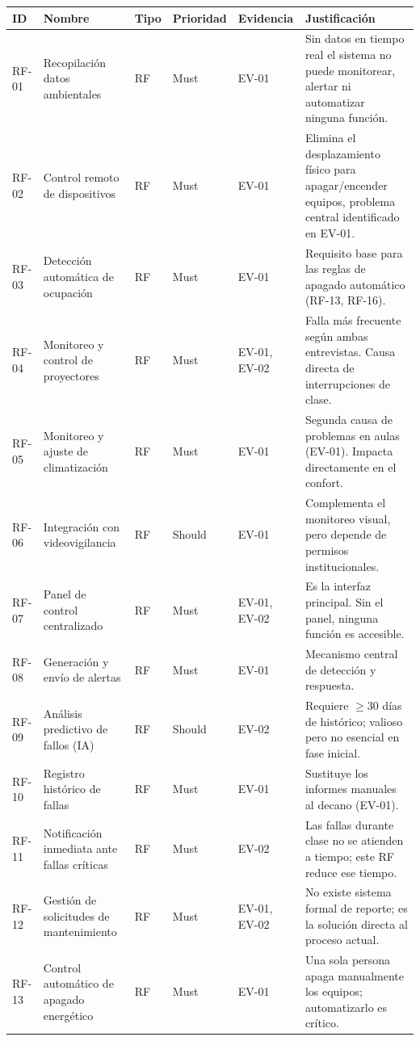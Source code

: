 \begingroup
\small
\begin{longtable}{|p{2.6cm}|p{2.6cm}|p{2.6cm}|p{2.6cm}|p{2.6cm}|p{2.6cm}|}
\hline
ID & Nombre & Tipo & Prioridad & Evidencia & Justificación \\ \hline
RF-01 & Recopilación datos ambientales & RF & Must & EV-01 & Sin datos en tiempo real el sistema no puede monitorear, alertar ni automatizar ninguna función. \\ \hline
RF-02 & Control remoto de dispositivos & RF & Must & EV-01 & Elimina el desplazamiento físico para apagar/encender equipos, problema central identificado en EV-01. \\ \hline
RF-03 & Detección automática de ocupación & RF & Must & EV-01 & Requisito base para las reglas de apagado automático (RF-13, RF-16). \\ \hline
RF-04 & Monitoreo y control de proyectores & RF & Must & EV-01, EV-02 & Falla más frecuente según ambas entrevistas. Causa directa de interrupciones de clase. \\ \hline
RF-05 & Monitoreo y ajuste de climatización & RF & Must & EV-01 & Segunda causa de problemas en aulas (EV-01). Impacta directamente en el confort. \\ \hline
RF-06 & Integración con videovigilancia & RF & Should & EV-01 & Complementa el monitoreo visual, pero depende de permisos institucionales. \\ \hline
RF-07 & Panel de control centralizado & RF & Must & EV-01, EV-02 & Es la interfaz principal. Sin el panel, ninguna función es accesible. \\ \hline
RF-08 & Generación y envío de alertas & RF & Must & EV-01 & Mecanismo central de detección y respuesta. \\ \hline
RF-09 & Análisis predictivo de fallos (IA) & RF & Should & EV-02 & Requiere $\geq$30 días de histórico; valioso pero no esencial en fase inicial. \\ \hline
RF-10 & Registro histórico de fallas & RF & Must & EV-01 & Sustituye los informes manuales al decano (EV-01). \\ \hline
RF-11 & Notificación inmediata ante fallas críticas & RF & Must & EV-02 & Las fallas durante clase no se atienden a tiempo; este RF reduce ese tiempo. \\ \hline
RF-12 & Gestión de solicitudes de mantenimiento & RF & Must & EV-01, EV-02 & No existe sistema formal de reporte; es la solución directa al proceso actual. \\ \hline
RF-13 & Control automático de apagado energético & RF & Must & EV-01 & Una sola persona apaga manualmente los equipos; automatizarlo es crítico. \\ \hline

\end{longtable}
